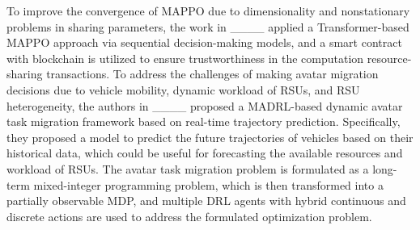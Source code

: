  To improve the convergence of MAPPO due to dimensionality and nonstationary problems in sharing parameters, the work in ____ applied a Transformer-based MAPPO approach via sequential decision-making models, and a smart contract with blockchain is utilized to ensure trustworthiness in the computation resource-sharing transactions.  To address the challenges of making avatar migration decisions due to vehicle mobility, dynamic workload of RSUs, and RSU heterogeneity, the authors in ____ proposed a MADRL-based dynamic avatar task migration framework based on real-time trajectory prediction. Specifically, they proposed a model to predict the future trajectories of vehicles based on their historical data, which could be useful for forecasting the available resources and workload of RSUs. The avatar task migration problem is formulated as a long-term mixed-integer programming problem, which is then transformed into a partially observable MDP, and multiple DRL agents with hybrid continuous and discrete actions are used to address the formulated optimization problem.

